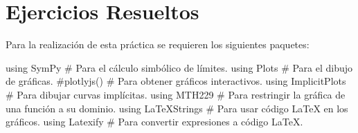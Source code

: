 \documentclass[
  a4paper,
]{scrreport}
\newenvironment{Shaded}{\begin{snugshade}}{\end{snugshade}}
\newcommand{\BuiltInTok}[1]{\textcolor[rgb]{0.00,0.23,0.31}{#1}}
\newcommand{\CommentTok}[1]{\textcolor[rgb]{0.37,0.37,0.37}{#1}}
\newcommand{\ImportTok}[1]{\textcolor[rgb]{0.00,0.46,0.62}{#1}}
\theoremstyle{definition}
\theoremstyle{remark}
\begin{document}
\hypertarget{ejercicios-resueltos-3}{%
\section{Ejercicios Resueltos}\label{ejercicios-resueltos-3}}

Para la realización de esta práctica se requieren los siguientes
paquetes:

\begin{Shaded}
\begin{Highlighting}[]
\ImportTok{using} \BuiltInTok{SymPy  }\CommentTok{\# Para el cálculo simbólico de límites.}
\ImportTok{using} \BuiltInTok{Plots  }\CommentTok{\# Para el dibujo de gráficas.}
\CommentTok{\#plotlyjs() \# Para obtener gráficos interactivos.}
\ImportTok{using} \BuiltInTok{ImplicitPlots }\CommentTok{\# Para dibujar curvas implícitas.}
\ImportTok{using} \BuiltInTok{MTH229 }\CommentTok{\# Para restringir la gráfica de una función a su dominio.}
\ImportTok{using} \BuiltInTok{LaTeXStrings  }\CommentTok{\# Para usar código LaTeX en los gráficos.}
\ImportTok{using} \BuiltInTok{Latexify  }\CommentTok{\# Para convertir expresiones a código LaTeX.}
\end{Highlighting}
\end{Shaded}
\end{document}

